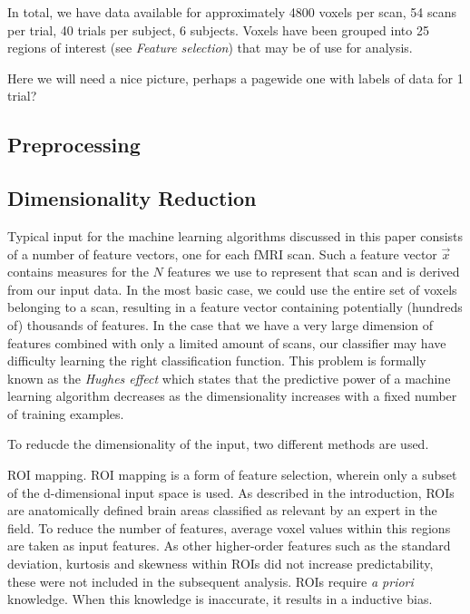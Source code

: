 \documentclass[preprint,journal,11pt]{vgtc}
\begin{document}
In total, we have data available for approximately 4800 voxels per scan, 54 scans per trial, 40 trials per subject, 6 subjects. Voxels have been grouped into 25 regions of interest (see \textit{Feature selection}) that may be of use for analysis.

Here we will need a nice picture, perhaps a pagewide one with labels of data for 1 trial?

\subsection{Preprocessing}

\subsection{Dimensionality Reduction}
Typical input for the machine learning algorithms discussed in this paper consists of a number of feature vectors, one for each fMRI scan. Such a feature vector $\vec{x}$ contains measures for the $N$ features we use to represent that scan and is derived from our input data. In the most basic case, we could use the entire set of voxels belonging to a scan, resulting in a feature vector containing potentially (hundreds of) thousands of features.
In the case that we have a very large dimension of features combined with only a limited amount of scans, our classifier may have difficulty learning the right classification function. This problem is formally known as the \textit{Hughes effect}\cite{Hughes1054102} which states that the predictive power of a machine learning algorithm decreases as the dimensionality increases with a fixed number of training examples.

To reducde the dimensionality of the input, two different methods are used.

ROI mapping. ROI mapping is a form of feature selection, wherein only a subset of the d-dimensional input space is used. As described in the introduction, ROIs are anatomically defined brain areas classified as relevant by an expert in the field. To reduce the number of features, average voxel values within this regions are taken as input features. As other higher-order features such as the standard deviation, kurtosis and skewness within ROIs did not increase predictability, these were not included in the subsequent analysis. ROIs require \textit{a priori} knowledge. When this knowledge is inaccurate, it results in a inductive bias.
\end{document}
